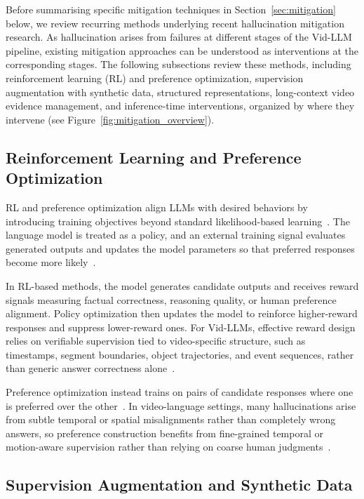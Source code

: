 \documentclass[10pt]{article} %
\begin{document}
Before summarising specific mitigation techniques in Section~\ref{sec:mitigation} below, we review recurring methods underlying recent hallucination mitigation research. As hallucination arises from failures at different stages of the Vid-LLM pipeline, existing mitigation approaches can be understood as interventions at the corresponding stages. The following subsections review these methods, including reinforcement learning (RL) and preference optimization, supervision augmentation with synthetic data, structured representations, long-context video evidence management, and inference-time interventions, organized by where they intervene (see Figure~\ref{fig:mitigation_overview}).

\subsection{Reinforcement Learning and Preference Optimization}

RL and preference optimization align LLMs with desired behaviors by introducing training objectives beyond standard likelihood-based learning~\citep{zhang2025survey, rafailov2023direct}. The language model is treated as a policy, and an external training signal evaluates generated outputs and updates the model parameters so that preferred responses become more likely~\citep{liu2025reinforcement}.

In RL-based methods, the model generates candidate outputs and receives reward signals measuring factual correctness, reasoning quality, or human preference alignment. Policy optimization then updates the model to reinforce higher-reward responses and suppress lower-reward ones. For Vid-LLMs, effective reward design relies on verifiable supervision tied to video-specific structure, such as timestamps, segment boundaries, object trajectories, and event sequences, rather than generic answer correctness alone~\citep{Feng2025VideoR1RV, Chen2025ChronoForgeRLCF}.

Preference optimization instead trains on pairs of candidate responses where one is preferred over the other~\citep{Huang2025VistaDPOVH}. In video-language settings, many hallucinations arise from subtle temporal or spatial misalignments rather than completely wrong answers, so preference construction benefits from fine-grained temporal or motion-aware supervision rather than relying on coarse human judgments~\citep{Li2025TemporalPO, Kulkarni2025VideoPASTA7P}.

\subsection{Supervision Augmentation and Synthetic Data}
\end{document}

